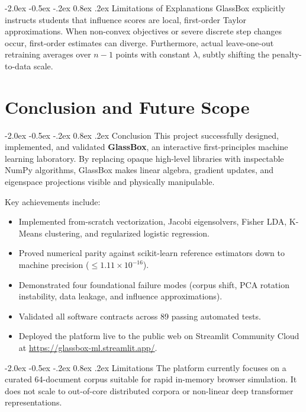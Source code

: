 \documentclass[12pt,a4paper]{report}
\makeatletter
\newenvironment{tightitemize}{%
  \begin{itemize}%
    \setlength{\itemsep}{1.5pt}%
    \setlength{\parskip}{0pt}%
    \setlength{\parsep}{0pt}%
}{%
  \end{itemize}%
}
\renewcommand\section{\@startsection {section}{1}{\z@}%
                                   {-2.0ex \@plus -0.5ex \@minus -.2ex}%
                                   {0.8ex \@plus.2ex}%
                                   {\normalfont\fontsize{14}{17}\bfseries\color{headerblue}}}
\makeatother
\begin{document}
\section{Limitations of Explanations}
GlassBox explicitly instructs students that influence scores are local, first-order Taylor approximations. When non-convex objectives or severe discrete step changes occur, first-order estimates can diverge. Furthermore, actual leave-one-out retraining averages over $n-1$ points with constant $\lambda$, subtly shifting the penalty-to-data scale.

\chapter{Conclusion and Future Scope}

\section{Conclusion}
This project successfully designed, implemented, and validated \textbf{GlassBox}, an interactive first-principles machine learning laboratory. By replacing opaque high-level libraries with inspectable NumPy algorithms, GlassBox makes linear algebra, gradient updates, and eigenspace projections visible and physically manipulable. 

Key achievements include:
\begin{tightitemize}
    \item Implemented from-scratch vectorization, Jacobi eigensolvers, Fisher LDA, K-Means clustering, and regularized logistic regression.
    \item Proved numerical parity against scikit-learn reference estimators down to machine precision ($\le 1.11 \times 10^{-16}$).
    \item Demonstrated four foundational failure modes (corpus shift, PCA rotation instability, data leakage, and influence approximations).
    \item Validated all software contracts across 89 passing automated tests.
    \item Deployed the platform live to the public web on Streamlit Community Cloud at \url{https://glassbox-ml.streamlit.app/}.
\end{tightitemize}

\section{Limitations}
The platform currently focuses on a curated 64-document corpus suitable for rapid in-memory browser simulation. It does not scale to out-of-core distributed corpora or non-linear deep transformer representations.
\end{document}

